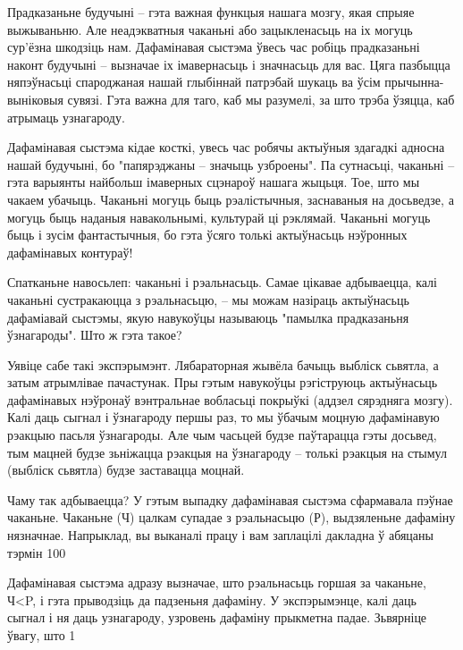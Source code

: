 Прадказаньне будучыні – гэта важная функцыя нашага мозгу, якая спрыяе выжываньню. Але неадэкватныя чаканьні або зацыкленасьць на іх могуць сур'ёзна шкодзіць нам. Дафамінавая сыстэма ўвесь час робіць прадказаньні наконт будучыні – вызначае іх імавернасьць і значнасьць для вас. Цяга пазбыцца няпэўнасьці спароджаная нашай глыбіннай патрэбай шукаць ва ўсім прычынна-выніковыя сувязі. Гэта важна для таго, каб мы разумелі, за што трэба ўзяцца, каб атрымаць узнагароду.

Дафамінавая сыстэма кідае косткі, увесь час робячы актыўныя здагадкі адносна нашай будучыні, бо "папярэджаны – значыць узброены". Па сутнасьці, чаканьні – гэта варыянты найбольш імаверных сцэнароў нашага жыцьця. Тое, што мы чакаем убачыць. Чаканьні могуць быць рэалістычныя, заснаваныя на досьведзе, а могуць быць наданыя навакольнымі, культурай ці рэклямай. Чаканьні могуць быць і зусім фантастычныя, бо гэта ўсяго толькі актыўнасьць нэўронных дафамінавых контураў!

Спатканьне навосьлеп: чаканьні і рэальнасьць. Самае цікавае адбываецца, калі чаканьні сустракаюцца з рэальнасьцю, – мы можам назіраць актыўнасьць дафаміавай сыстэмы, якую навукоўцы называюць "памылка прадказаньня ўзнагароды". Што ж гэта такое?

Уявіце сабе такі экспэрымэнт. Лябараторная жывёла бачыць выбліск сьвятла, а затым атрымлівае пачастунак. Пры гэтым навукоўцы рэгіструюць актыўнасьць дафамінавых нэўронаў вэнтральнае вобласьці покрыўкі (аддзел сярэдняга мозгу). Калі даць сыгнал і ўзнагароду першы раз, то мы ўбачым моцную дафамінавую рэакцыю пасьля ўзнагароды. Але чым часьцей будзе паўтарацца гэты досьвед, тым мацней будзе зьніжацца рэакцыя на ўзнагароду – толькі рэакцыя на стымул (выбліск сьвятла) будзе заставацца моцнай.

Чаму так адбываецца? У гэтым выпадку дафамінавая сыстэма сфармавала пэўнае чаканьне. Чаканьне (Ч) цалкам супадае з рэальнасьцю (Р), выдзяленьне дафаміну нязначнае. Напрыклад, вы выканалі працу і вам заплацілі дакладна ў абяцаны тэрмін 100%

Дафамінавая сыстэма адразу вызначае, што рэальнасьць горшая за чаканьне, Ч<P, і гэта прыводзіць да падзеньня дафаміну. У экспэрымэнце, калі даць сыгнал і ня даць узнагароду, узровень дафаміну прыкметна падае. Зьвярніце ўвагу, што 1%


